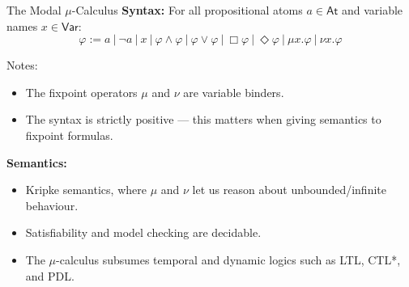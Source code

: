 \documentclass[aspectratio=169]{beamer}
\newcommand{\meaningof}[1]{\ensuremath{\llbracket #1 \rrbracket}}
\begin{document}
\begin{frame}{The Modal $\mu$-Calculus}
  \textbf{Syntax:}
  For all propositional atoms $a \in \mathsf{At}$ and variable names $x \in \mathsf{Var}$:
  \begin{equation*}
    \varphi := a~|~\neg a~|~x~|~\varphi \land \varphi~|~\varphi \lor \varphi~|~\Box \varphi~|~\Diamond \varphi~|~\mu x. \varphi~|~\nu x. \varphi
  \end{equation*}

  \bigskip

  Notes:
 \begin{itemize}
  \item The fixpoint operators $\mu$ and $\nu$ are variable binders.
         \smallskip
  \item The syntax is strictly positive --- this matters when giving semantics to fixpoint formulas.
         \smallskip

 \end{itemize}

 \pause
 \bigskip
 \textbf{Semantics:}
 \begin{itemize}
  \item Kripke semantics, where $\mu$ and $\nu$ let us reason about unbounded/infinite behaviour.
         \smallskip
  \item Satisfiability and model checking are decidable.
         \smallskip
  \item The $\mu$-calculus subsumes temporal and dynamic logics such as LTL, CTL*, and PDL.
 \end{itemize}


\end{frame}
\end{document}
